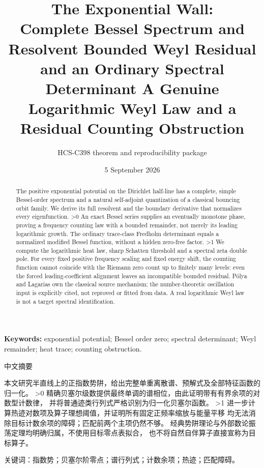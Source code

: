 \documentclass[10pt]{article}
\title{The Exponential Wall:\\
\ifcase\CRevisionRound Complete Bessel Spectrum and Resolvent
\or Bounded Weyl Residual and an Ordinary Spectral Determinant
\else A Genuine Logarithmic Weyl Law and a Residual Counting Obstruction\fi}
\author{HCS-C398 theorem and reproducibility package}
\date{5 September 2026}
\begin{document}
\maketitle
\begin{abstract}
The positive exponential potential on the Dirichlet half-line has a complete,
simple Bessel-order spectrum and a natural self-adjoint quantization of a
classical bouncing orbit family. We derive its full resolvent and the
boundary derivative that normalizes every eigenfunction.
\ifnum\CRevisionRound>0
An exact Bessel series supplies an eventually monotone phase, proving a
frequency counting law with a bounded remainder, not merely its leading
logarithmic growth. The ordinary trace-class Fredholm determinant equals
a normalized modified Bessel function, without a hidden zero-free factor.
\fi
\ifnum\CRevisionRound>1
We compute the logarithmic heat law, sharp Schatten threshold and a spectral
zeta double pole. For every fixed positive frequency scaling and fixed
energy shift, the counting function cannot coincide with the Riemann zero
count up to finitely many levels: even the forced leading-coefficient
alignment leaves an incompatible bounded residual.
\fi
Pólya and Lagarias own the classical source mechanism; the number-theoretic
oscillation input is explicitly cited, not reproved or fitted from data.
A real logarithmic Weyl law is not a target spectral identification.
\end{abstract}
\noindent\textbf{Keywords:} exponential potential; Bessel order zero; spectral determinant; Weyl remainder; heat trace; counting obstruction.
\begin{otherlanguage}{chinese-simplified}
\begin{center}{\large 中文摘要}\end{center}
\begin{sloppypar}
本文研究半直线上的正指数势阱，给出完整单重离散谱、预解式及全部特征函数的归一化。
\ifnum\CRevisionRound>0
精确贝塞尔级数提供最终单调的谱相位，由此证明带有有界余项的对数型计数律，
并将普通迹类行列式严格识别为归一化贝塞尔函数。
\fi
\ifnum\CRevisionRound>1
进一步计算热迹对数项及算子理想阈值，并证明所有固定正频率缩放与能量平移
均无法消除目标计数余项的障碍；匹配前两个主项仍然不够。
\fi
经典势阱理论与外部数论振荡定理均明确归属，不使用目标零点表拟合，
也不将自然自伴算子直接宣称为目标算子。
\end{sloppypar}
\noindent 关键词：指数势；贝塞尔阶零点；谱行列式；计数余项；热迹；匹配障碍。
\end{otherlanguage}
\end{document}
